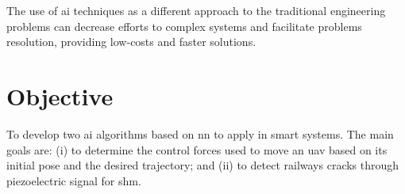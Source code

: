 The use of \gls*{ai} techniques as a different approach to the traditional engineering problems can decrease efforts to complex systems and facilitate problems resolution, providing low-costs and faster solutions. 

\section{Objective}

To develop two \gls*{ai} algorithms based on \gls*{nn} to apply in smart systems.
The main goals are: (i) to determine the control forces used to move an \gls*{uav} based on its initial pose and the desired trajectory; and (ii) to detect railways cracks through piezoelectric signal for \gls*{shm}.